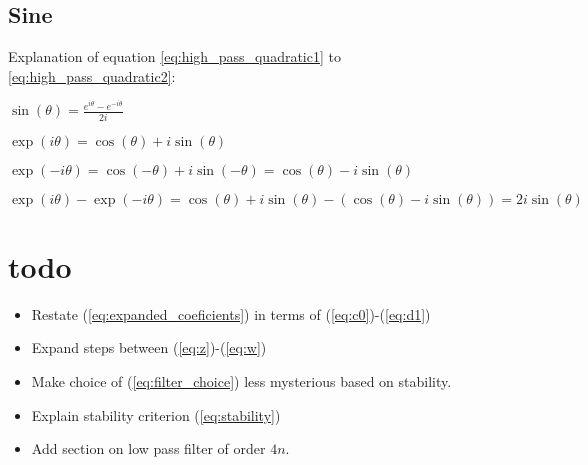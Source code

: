 \documentclass[a4paper]{article}
\begin{document}
\subsection{Sine}
\label{sin}
Explanation of equation \ref{eq:high_pass_quadratic1} to \ref{eq:high_pass_quadratic2}:

$\sin(\theta) = \frac{e^{i \theta} - e^{-i\theta}}{2 i}$

$\exp(i\theta) = \cos(\theta) + i \sin(\theta)$

$\exp(-i\theta) = \cos(-\theta) + i \sin(-\theta)
= \cos(\theta) - i \sin(\theta)$

$\exp(i\theta) - \exp(-i\theta) = \cos(\theta) + i \sin(\theta) - (\cos(\theta) - i \sin(\theta)) = 2 i \sin(\theta)$


\section{todo}
\begin{itemize}
\item Restate (\ref{eq:expanded_coeficients}) in terms of (\ref{eq:c0})-(\ref{eq:d1})
\item Expand steps between (\ref{eq:z})-(\ref{eq:w})
\item Make choice of (\ref{eq:filter_choice}) less mysterious based on stability.
\item Explain stability criterion (\ref{eq:stability})
\item Add section on low pass filter of order $4n$.
\end{itemize}
\end{document}
